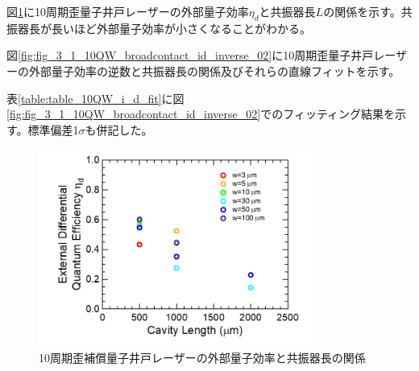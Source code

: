 {図\ref{fig:fig_3_1_10QW_broadcontact_id_02}に10周期歪量子井戸レーザーの外部量子効率$\eta_{d}$と共振器長$L$の関係を示す。共振器長が長いほど外部量子効率が小さくなることがわかる。

図\ref{fig:fig_3_1_10QW_broadcontact_id_inverse_02}に10周期歪量子井戸レーザーの外部量子効率の逆数と共振器長の関係及びそれらの直線フィットを示す。

表\ref{table:table_10QW_i_d_fit}に図\ref{fig:fig_3_1_10QW_broadcontact_id_inverse_02}でのフィッティング結果を示す。標準偏差1$\sigma$も併記した。

\begin{figure}[h]
	\centering
	\includegraphics[width=9cm]{figure/fig_3_1_10QW_broadcontact_id_02.png}
	\caption{10周期歪補償量子井戸レーザーの外部量子効率と共振器長の関係}
	\label{fig:fig_3_1_10QW_broadcontact_id_02}
\end{figure}

}
